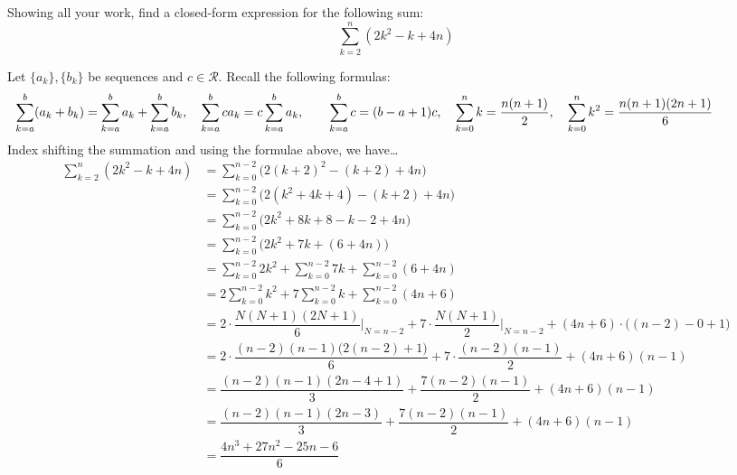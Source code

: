 \documentclass[11pt,letterpaper]{article}
\begin{document}
\newpage



 Showing all your work, find a closed-form expression for the following sum:
	\[
	\sum_{k=2}^n (2k^2 - k + 4n)
	\] \pspace

\sol Let $\{ a_k \}, \{ b_k \}$ be sequences and $c \in \mathcal{R}$. Recall the following formulas: 
	\[
	\hspace{-1.75cm} \sum_{k= a}^b (a_k + b_k)= \sum_{k= a}^b a_k + \sum_{k=a}^b b_k, \quad \sum_{k= a}^b ca_k= c \sum_{k= a}^b a_k, \qquad \sum_{k= a}^b c= (b - a + 1)c, \quad \sum_{k=0}^n k= \dfrac{n(n + 1)}{2}, \quad \sum_{k=0}^n k^2= \dfrac{n(n + 1)(2n + 1)}{6}
	\] 
Index shifting the summation and using the formulae above, we have\dots
	\[
	\begin{aligned}
	\sum_{k=2}^n (2k^2 - k + 4n)&= \sum_{k=0}^{n-2} \big( 2(k + 2)^2 - (k + 2) + 4n \big) \\[0.3cm]
	&= \sum_{k=0}^{n-2} \big( 2(k^2 + 4k + 4) - (k + 2) + 4n \big) \\[0.3cm]
	&= \sum_{k=0}^{n-2} \big( 2k^2 + 8k + 8 - k - 2 + 4n \big) \\[0.3cm]
	&= \sum_{k=0}^{n-2} \big( 2k^2 + 7k + (6 + 4n) \big) \\[0.3cm]
	&= \sum_{k=0}^{n-2} 2k^2 + \sum_{k=0}^{n-2} 7k + \sum_{k=0}^{n-2} (6 + 4n) \\[0.3cm]
	&= 2 \sum_{k=0}^{n-2} k^2 + 7 \sum_{k=0}^{n-2} k + \sum_{k=0}^{n-2} (4n + 6) \\[0.3cm]
	&= 2 \cdot \dfrac{N(N + 1)(2N + 1)}{6} \bigg|_{N= n - 2} + 7 \cdot \dfrac{N(N + 1)}{2} \bigg|_{N= n - 2} + (4n + 6) \cdot \big( (n - 2) - 0 + 1 \big) \\[0.3cm]
	&= 2 \cdot \dfrac{(n - 2)(n - 1) \big(2 (n - 2) + 1 \big)}{6} + 7 \cdot \dfrac{(n - 2)(n - 1)}{2} + (4n + 6) (n - 1) \\[0.3cm]
	&= \dfrac{(n - 2)(n - 1)(2n - 4 + 1)}{3} + \dfrac{7(n - 2)(n - 1)}{2} + (4n + 6)(n - 1) \\[0.3cm]
	&= \dfrac{(n - 2)(n - 1)(2n - 3)}{3} + \dfrac{7(n - 2)(n - 1)}{2} + (4n + 6)(n - 1) \\[0.3cm]
	&= \dfrac{4n^3 + 27n^2 - 25n - 6}{6}
	\end{aligned}
	\]
\end{document}
